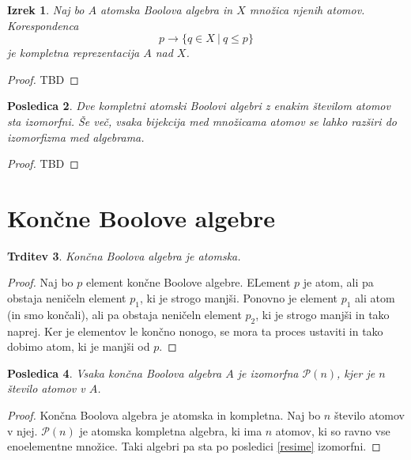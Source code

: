 \documentclass{amsart}
\newtheorem{izrek}{Izrek}[section]
\newtheorem{trditev}[izrek]{Trditev}
\newtheorem{posledica}[izrek]{Posledica}
\begin{document}
\begin{izrek}
    Naj bo $A$ atomska Boolova algebra in $X$ množica njenih atomov.
    Korespondenca
    \[p \to \{q\in X~|~q\leq p\}\]
    je kompletna reprezentacija $A$ nad $X$.
\end{izrek}

\begin{proof}
    TBD
\end{proof}

\begin{posledica}
    Dve kompletni atomski Boolovi algebri z enakim številom atomov sta izomorfni.
    Še več, vsaka bijekcija med množicama atomov se lahko razširi do 
    izomorfizma med algebrama.
\end{posledica}

\begin{proof}
    TBD
\end{proof}



\section{Končne Boolove algebre}

\begin{trditev}
    Končna Boolova algebra je atomska.
\end{trditev}

\begin{proof}
    Naj bo \(p\) element končne Boolove algebre. ELement \(p\) je atom, ali pa obstaja 
    neničeln element \(p_1\), ki je strogo manjši. Ponovno je element \(p_1\) ali atom (in smo končali), ali pa obstaja 
    neničeln element \(p_2\), ki je strogo manjši in tako naprej. Ker je elementov 
    le končno nonogo, se mora ta proces ustaviti
    in tako dobimo atom, ki je manjši od \(p\).
\end{proof}

\begin{posledica}
    Vsaka končna Boolova algebra $A$ je izomorfna $\mathcal{P}(n)$, kjer je $n$ število 
    atomov v $A$.
\end{posledica}

\begin{proof}
    Končna Boolova algebra je atomska in kompletna. Naj bo $n$ število atomov v njej.
    $\mathcal{P}(n)$ je atomska kompletna algebra, ki ima $n$ atomov, ki so 
    ravno vse enoelementne množice. Taki algebri pa sta po posledici \ref{resime} izomorfni.
\end{proof}
\end{document}
